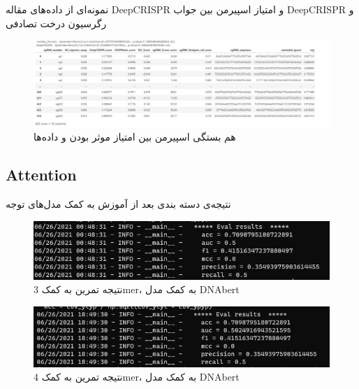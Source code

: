 \documentclass[12pt,a4paper,BCOR=.7cm,headsepline,bibliography=totoc]{report}
\begin{document}
نمونه‌ای از داده‌های مقاله DeepCRISPR و امتیاز اسپیرمن بین جواب DeepCRISPR و رگرسیون درخت تصادفی
\begin{figure}[H]
\centering
\includegraphics[width=16cm, ]{pictures/DeepCRISPR_Data.jpg}
\caption{
هم بستگی اسپیرمن بین امتیاز موثر بودن و داده‌ها
}\label{wrap-fig:4}
\end{figure}


\subsection{Attention}
نتیجه‌ی دسته بندی بعد از آموزش به کمک مدل‌های توجه
\begin{figure}[H]
\centering
\includegraphics[width=15cm, ]{pictures/3mer.jpg}
\caption{
نتیجه تمرین به کمک 3mer، به کمک مدل DNAbert
}\label{wrap-fig:4}
\end{figure}

\begin{figure}[H]
\centering
\includegraphics[width=15cm, ]{pictures/4mer.jpg}
\caption{
نتیجه تمرین به کمک 4mer، به کمک مدل DNAbert
}\label{wrap-fig:4}
\end{figure}
\end{document}
